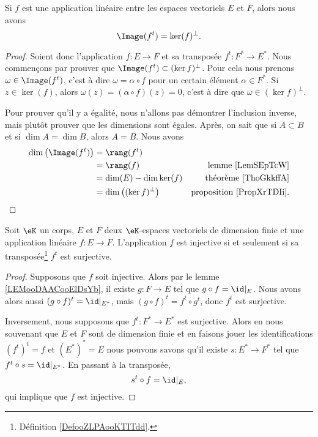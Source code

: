 \begin{proposition}        \label{PropWOPIooBHFDdP}
    Si \( f\) est une application linéaire entre les espaces vectoriels \( E\) et \( F\), alors nous avons
    \begin{equation}
        \Image(f^t)=\ker(f)^{\perp}.
    \end{equation}
\end{proposition}

\begin{proof}
    Soient donc l'application \( f\colon E\to F\) et sa transposée \( f^t\colon F^*\to E^*\). Nous commençons par prouver que \( \Image(f^{t})\subset(\ker f)^{\perp}\). Pour cela nous prenons \( \omega\in \Image(f^t)\), c'est à dire \( \omega=\alpha\circ f\) pour un certain élément \( \alpha\in F^*\). Si \( z\in\ker(f)\), alors \( \omega(z)=(\alpha\circ f)(z)=0\), c'est à dire que \( \omega\in (\ker f)^{\perp}\).

    Pour prouver qu'il y a égalité, nous n'allons pas démontrer l'inclusion inverse, mais plutôt prouver que les dimensions sont égales. Après, on sait que si \( A\subset B\) et si \( \dim A=\dim B\), alors \( A=B\). Nous avons
    \begin{subequations}
        \begin{align}
            \dim\big( \Image(f^t) \big)&=\rang(f^t)\\
            &=\rang(f)  &\text{lemme \ref{LemSEpTcW}}\\
            &=\dim(E)-\dim\ker(f)   &\text{théorème \ref{ThoGkkffA}}\\
            &=\dim\big( (\ker f)^{\perp} \big)  &\text{proposition \ref{PropXrTDIi}}.
        \end{align}
    \end{subequations}
\end{proof}

\begin{lemma}
    Soit \( \eK\) un corps, \( E\) et \( F\) deux \( \eK\)-espaces vectoriels de dimension finie et une application linéaire \( f\colon E\to F\). L'application \( f\) est injective si et seulement si sa transposée\footnote{Définition \ref{DefooZLPAooKTITdd}.} \( f^t\) est surjective.
\end{lemma}

\begin{proof}
    Supposons que \( f\) soit injective. Alors par le lemme \ref{LEMooDAACooElDsYb}, il existe \( g\colon F\to E\) tel que \( g\circ f=\id|_E\). Nous avons alors aussi \( (g\circ f)^t=\id|_{E^*}\), mais \( (g\circ f)^t=f^t\circ g^t\), donc \( f^t\) est surjective.

    Inversement, nous supposons que \( f^t\colon F^*\to E^*\) est surjective. Alors en nous souvenant que \( E\) et \( F\) sont de dimension finie et en faisons jouer les identifications \( (f^t)^t=f\) et \( (E^*)^*=E\) nous pouvons savons qu'il existe \( s\colon E^*\to F^*\) tel que \( f^t\circ s=\id|_{E^*}\). En passant à la transposée,
    \begin{equation}
        s^t\circ f=\id|_{E},
    \end{equation}
    qui implique que \( f\) est injective.
\end{proof}

